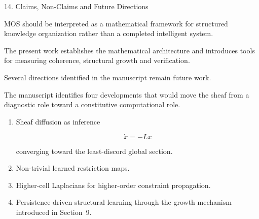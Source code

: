 
\begin{mosbox}{{14. Claims, Non-Claims and Future Directions}}

\BodyFont

MOS should be interpreted as a mathematical framework for structured
knowledge organization rather than a completed intelligent system.

The present work establishes the mathematical architecture and introduces
tools for measuring coherence, structural growth and verification.

Several directions identified in the manuscript remain future work.

\end{mosbox}


\begin{highlightbox}


\BodyFont

The manuscript identifies four developments that would move the sheaf
from a diagnostic role toward a constitutive computational role.

\begin{enumerate}

\item
Sheaf diffusion as inference

\[
\dot{x}
=
-Lx
\]

converging toward the least-discord global section.

\vspace{2mm}

\item

Non-trivial learned restriction maps.

\vspace{2mm}

\item

Higher-cell Laplacians for higher-order constraint propagation.

\vspace{2mm}

\item

Persistence-driven structural learning through the growth mechanism
introduced in Section~9.

\end{enumerate}

\end{highlightbox}

